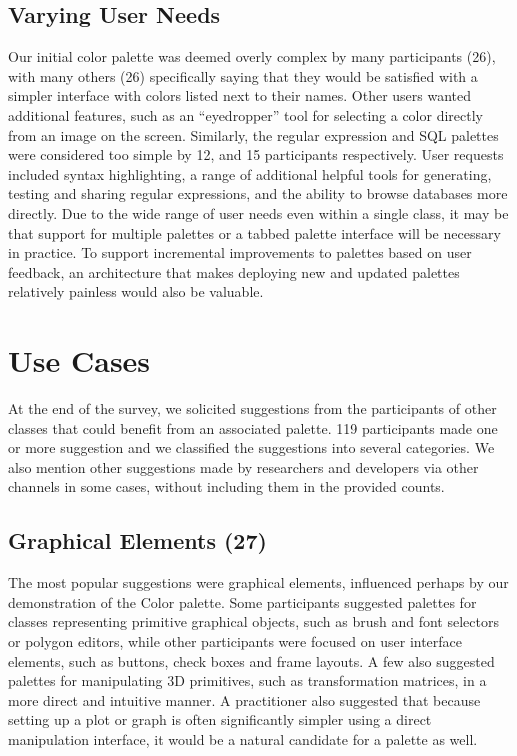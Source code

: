 \documentclass[10pt, conference, compsocconf]{IEEEtran}
\begin{document}
\subsection{Varying User Needs}

Our initial color palette was deemed overly complex by many participants (26), with many others (26) specifically saying that they would be satisfied with a simpler interface with colors listed next to their names. Other users wanted additional features, such as an ``eyedropper'' tool for selecting a color directly from an image on the screen. Similarly, the regular expression and SQL palettes were considered too simple by 12, and 15 participants respectively. User requests included syntax highlighting, a range of additional helpful tools for generating,  testing and sharing regular expressions, and the ability to browse databases more directly. Due to the wide range of user needs even within a single class, it may be that support for multiple palettes or a tabbed palette interface will be necessary in practice. To support incremental improvements to palettes based on user feedback, an architecture that makes deploying new and updated palettes relatively painless would also be valuable.


\section{Use Cases}
At the end of the survey, we solicited suggestions from the participants of other classes that could benefit from an associated palette. 119 participants made one or more suggestion and we classified the suggestions into several categories. We also mention other suggestions made by researchers and developers via other channels in some cases, without including them in the provided counts.

\subsection{Graphical Elements (27)}
The most popular suggestions were graphical elements, influenced perhaps by our demonstration of the Color palette. Some participants suggested palettes for classes representing primitive graphical objects, such as brush and font selectors or polygon editors, while other participants were focused on user interface elements, such as buttons, check boxes and frame layouts. A few also suggested palettes for manipulating 3D primitives, such as transformation matrices, in a more direct and intuitive manner. A practitioner also suggested that because setting up a plot or graph is often significantly simpler using a direct manipulation interface, it would be a natural candidate for a palette as well.
\end{document}
